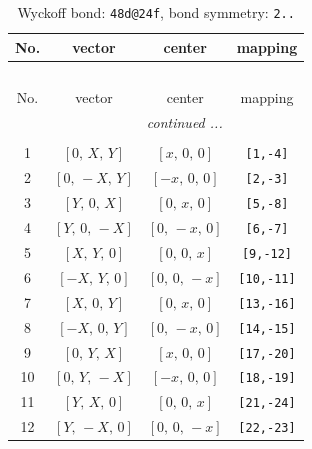 \documentclass[fleqn,8pt]{jsarticle}
\begin{document}
\begin{longtable}{cccc}
\caption{Wyckoff bond: {\tt 48d@24f}, bond symmetry: {\tt 2..}}
 \\
 \hline \hline
No. & vector & center & mapping \\ \hline \endfirsthead

\multicolumn{3}{l}{\tablename\ \thetable{}} \\
 \hline \hline
No. & vector & center & mapping \\ \hline \endhead

 \hline \hline
\multicolumn{3}{r}{\footnotesize\it continued ...} \\ \endfoot

 \hline \hline
\multicolumn{3}{r}{} \\ \endlastfoot

1 & $\left[ 0,\, X,\, Y \right]$ & $\left[ x,\, 0,\, 0 \right]$ & {\tt [1,-4]} \\ \hline
2 & $\left[ 0,\, - X,\, Y \right]$ & $\left[ - x,\, 0,\, 0 \right]$ & {\tt [2,-3]} \\ \hline
3 & $\left[ Y,\, 0,\, X \right]$ & $\left[ 0,\, x,\, 0 \right]$ & {\tt [5,-8]} \\ \hline
4 & $\left[ Y,\, 0,\, - X \right]$ & $\left[ 0,\, - x,\, 0 \right]$ & {\tt [6,-7]} \\ \hline
5 & $\left[ X,\, Y,\, 0 \right]$ & $\left[ 0,\, 0,\, x \right]$ & {\tt [9,-12]} \\ \hline
6 & $\left[ - X,\, Y,\, 0 \right]$ & $\left[ 0,\, 0,\, - x \right]$ & {\tt [10,-11]} \\ \hline
7 & $\left[ X,\, 0,\, Y \right]$ & $\left[ 0,\, x,\, 0 \right]$ & {\tt [13,-16]} \\ \hline
8 & $\left[ - X,\, 0,\, Y \right]$ & $\left[ 0,\, - x,\, 0 \right]$ & {\tt [14,-15]} \\ \hline
9 & $\left[ 0,\, Y,\, X \right]$ & $\left[ x,\, 0,\, 0 \right]$ & {\tt [17,-20]} \\ \hline
10 & $\left[ 0,\, Y,\, - X \right]$ & $\left[ - x,\, 0,\, 0 \right]$ & {\tt [18,-19]} \\ \hline
11 & $\left[ Y,\, X,\, 0 \right]$ & $\left[ 0,\, 0,\, x \right]$ & {\tt [21,-24]} \\ \hline
12 & $\left[ Y,\, - X,\, 0 \right]$ & $\left[ 0,\, 0,\, - x \right]$ & {\tt [22,-23]} \\
\end{longtable}
\renewcommand{\arraystretch}{1.2}
\end{document}

